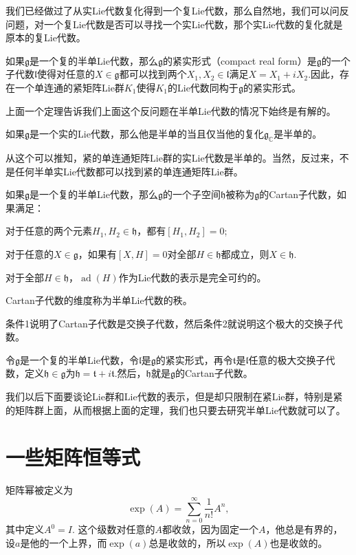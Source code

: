 \documentclass[10pt]{article}
\newcommand{\cc}{\mathbb{C}}
\newcommand{\lag}{{\mathfrak{g}}}
\DeclareMathOperator{\ad}{ad}
\begin{document}
我们已经做过了从实Lie代数复化得到一个复Lie代数，那么自然地，我们可以问反问题，对一个复Lie代数是否可以寻找一个实Lie代数，那个实Lie代数的复化就是原本的复Lie代数。

\para 如果$\lag$是一个复的半单Lie代数，那么$\lag$的紧实形式（compact real form）是$\lag$的一个子代数$\mathfrak{l}$使得对任意的$X\in\lag$都可以找到两个$X_1,X_2\in\mathfrak{l}$满足$X=X_1+iX_2$.因此，存在一个单连通的紧矩阵Lie群$K_1$使得$K_1$的Lie代数同构于$\lag$的紧实形式。

上面一个定理告诉我们上面这个反问题在半单Lie代数的情况下始终是有解的。

\pro 如果$\lag$是一个实的Lie代数，那么他是半单的当且仅当他的复化$\lag_\cc$是半单的。

从这个可以推知，紧的单连通矩阵Lie群的实Lie代数是半单的。当然，反过来，不是任何半单实Lie代数都可以找到紧的单连通矩阵Lie群。

\para 如果$\lag$是一个复的半单Lie代数，那么$\lag$的一个子空间$\mathfrak{h}$被称为$\lag$的Cartan子代数，如果满足：

 对于任意的两个元素$H_1,H_2\in\mathfrak{h}$，都有$[H_1,H_2]=0$;

 对于任意的$X\in \lag$，如果有$[X,H]=0$对全部$H\in\mathfrak{h}$都成立，则$X\in \mathfrak{h}$.

 对于全部$H\in \mathfrak{h}$，$\ad(H)$作为Lie代数的表示是完全可约的。

Cartan子代数的维度称为半单Lie代数的秩。

条件1说明了Cartan子代数是交换子代数，然后条件2就说明这个极大的交换子代数。

\pro 令$\lag$是一个复的半单Lie代数，令$\mathfrak{l}$是$\lag$的紧实形式，再令$\mathfrak{t}$是$\mathfrak{l}$任意的极大交换子代数，定义$\mathfrak{h}\in\lag$为$\mathfrak{h}=\mathfrak{t}+i\mathfrak{t}$.然后，$\mathfrak{h}$就是$\lag$的Cartan子代数。

我们以后下面要谈论Lie群和Lie代数的表示，但是却只限制在紧Lie群，特别是紧的矩阵群上面，从而根据上面的定理，我们也只要去研究半单Lie代数就可以了。

\newpage

\section{一些矩阵恒等式}

矩阵幂被定义为
\[
	\exp(A)=\sum_{n=0}^\infty \frac{1}{n!}A^n,
\]
其中定义$A^0=I$. 这个级数对任意的$A$都收敛，因为固定一个$A$，他总是有界的，设$a$是他的一个上界，而$\exp(a)$总是收敛的，所以$\exp(A)$也是收敛的。
\end{document}
